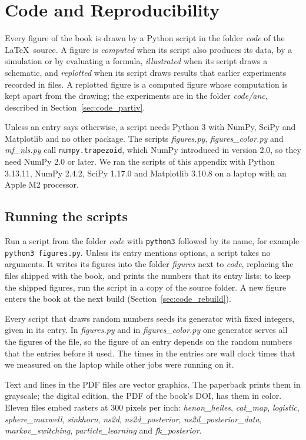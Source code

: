 \chapter{Code and Reproducibility}
\label{app:code}

Every figure of the book is drawn by a Python script in the folder \textit{code} of the \LaTeX\ source. A figure is \emph{computed} when its script also produces its data, by a simulation or by evaluating a formula, \emph{illustrated} when its script draws a schematic, and \emph{replotted} when its script draws results that earlier experiments recorded in files. A replotted figure is a computed figure whose computation is kept apart from the drawing; the experiments are in the folder \textit{code/anc}, described in Section~\ref{sec:code_partiv}.

Unless an entry says otherwise, a script needs Python 3 with NumPy, SciPy and Matplotlib and no other package. The scripts \textit{figures.py}, \textit{figures\_color.py} and \textit{mf\_nls.py} call \texttt{numpy.trapezoid}, which NumPy introduced in version 2.0, so they need NumPy 2.0 or later. We ran the scripts of this appendix with Python 3.13.11, NumPy 2.4.2, SciPy 1.17.0 and Matplotlib 3.10.8 on a laptop with an Apple M2 processor.

\section{Running the scripts}
\label{sec:code_running}

Run a script from the folder \textit{code} with \texttt{python3} followed by its name, for example \texttt{python3 figures.py}. Unless its entry mentions options, a script takes no arguments. It writes its figures into the folder \textit{figures} next to \textit{code}, replacing the files shipped with the book, and prints the numbers that its entry lists; to keep the shipped figures, run the script in a copy of the source folder. A new figure enters the book at the next build (Section~\ref{sec:code_rebuild}).

Every script that draws random numbers seeds its generator with fixed integers, given in its entry. In \textit{figures.py} and in \textit{figures\_color.py} one generator serves all the figures of the file, so the figure of an entry depends on the random numbers that the entries before it used. The times in the entries are wall clock times that we measured on the laptop while other jobs were running on it.

Text and lines in the PDF files are vector graphics. The paperback prints them in grayscale; the digital edition, the PDF of the book's DOI, has them in color. Eleven files embed rasters at 300 pixels per inch: \textit{henon\_heiles}, \textit{cat\_map}, \textit{logistic}, \textit{sphere\_maxwell}, \textit{sinkhorn}, \textit{ns2d}, \textit{ns2d\_posterior}, \textit{ns2d\_posterior\_data}, \textit{markov\_switching}, \textit{particle\_learning} and \textit{fk\_posterior}.

